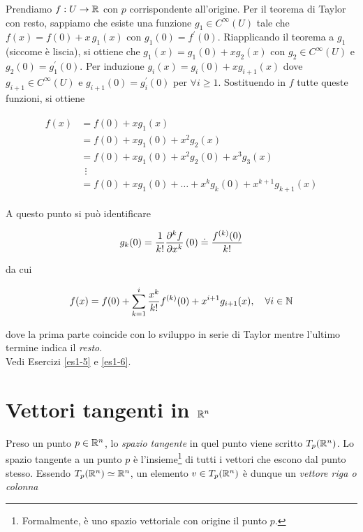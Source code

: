 Prendiamo $ f : U \to \mathbb{R} $ con $ p $ corrispondente all'origine. Per il teorema di Taylor con resto, sappiamo che esiste una funzione $ g_{1} \in C^{\infty}(U) $ tale che $ f(x) = f(0) + x \, g_{1}(x) $ con $ g_{1}(0) = f^{\prime}(0) $. Riapplicando il teorema a $ g_{1} $ (siccome è liscia), si ottiene che $ g_{1}(x) = g_{1}(0) + x g_{2}(x) $ con $ g_{2} \in C^{\infty}(U) $ e $ g_{2}(0) = g_{1}^{\prime}(0) $. Per induzione $ g_{i}(x) = g_{i}(0) + x g_{i+1}(x) $ dove $ g_{i+1} \in C^{\infty} (U) $ e $ g_{i+1}(0) = g_{i}^{\prime}(0) $ per $ \forall i \geqslant 1 $. Sostituendo in $ f $ tutte queste funzioni, si ottiene

\begin{align}
	\begin{split}
			f(x) &= f(0) + x g_{1}(x)\\
			&= f(0) + x g_{1}(0) + x^{2} g_{2}(x)\\
			&= f(0) + x g_{1}(0) + x^{2} g_{2}(0) + x^{3} g_{3}(x)\\
			& \;\, \vdots\\
			&= f(0) + x g_{1}(0) + \dots + x^{k} g_{k}(0) + x^{k+1} g_{k+1}(x)
	\end{split}
\end{align}

A questo punto si può identificare

\begin{equation}
	g_{k}(0) = \dfrac{1}{k!} \pdv[k]{f}{x} \, (0) \doteq \dfrac{f^{(k)}(0)}{k!}
\end{equation}

da cui

\begin{equation}
	f(x) = f(0) + \sum_{k=1}^{i} \dfrac{x^{k}}{k!} f^{(k)} (0) + x^{i+1} g_{i+1}(x) \qcomma \forall i \in \N
\end{equation}

dove la prima parte coincide con lo sviluppo in serie di Taylor mentre l'ultimo termine indica il \textit{resto}.\\
Vedi Esercizi \ref{es1-5} e \ref{es1-6}.

\section{Vettori tangenti in $ \mathbb{R}^{n} $}

Preso un punto $ p \in \mathbb{R}^{n} $, lo \textit{spazio tangente} in quel punto viene scritto $ T_{p}(\mathbb{R}^{n}) $. Lo spazio tangente a un punto $ p $ è l'insieme\footnote{%
	Formalmente, è uno spazio vettoriale con origine il punto $ p $.%
} di tutti i vettori che escono dal punto stesso. Essendo $ T_{p}(\mathbb{R}^{n}) \simeq \mathbb{R}^{n} $, un elemento $ v \in T_{p}(\mathbb{R}^{n}) $ è dunque un \textit{vettore riga o colonna}

